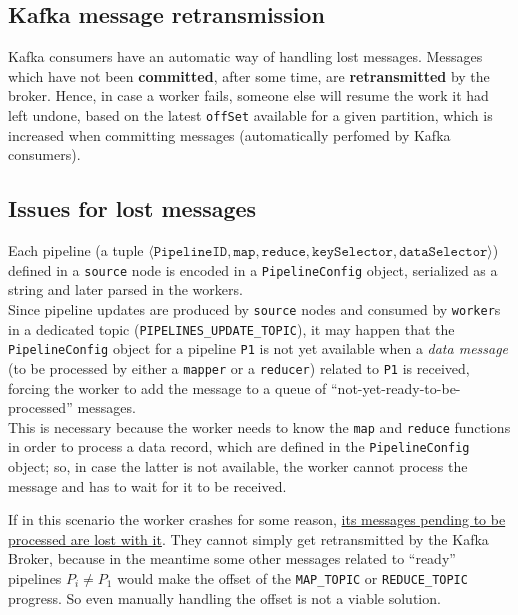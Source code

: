 \subsection{Kafka message retransmission}
Kafka consumers have an automatic way of handling lost messages. Messages which have not been \textbf{committed}, after some time, are \textbf{retransmitted} by the broker. Hence, in case a worker fails, someone else will resume the work it had left undone, based on the latest \texttt{offSet} available for a given partition, which is increased when committing messages (automatically perfomed by Kafka consumers).

\subsection{Issues for lost messages}
Each pipeline (a tuple $\langle \texttt{PipelineID}, \texttt{map}, \texttt{reduce}, \texttt{keySelector}, \texttt{dataSelector} \rangle$) defined in a \texttt{source} node is encoded in a \lstinline|PipelineConfig| object, serialized as a string and later parsed in the workers.\\ 
Since pipeline updates are produced by \texttt{source} nodes and consumed by \texttt{worker}s in a dedicated topic (\lstinline|PIPELINES_UPDATE_TOPIC|), it may happen that the \lstinline|PipelineConfig| object for a pipeline \lstinline|P1| is not yet available when a \textit{data message} (to be processed by either a \texttt{mapper} or a \texttt{reducer}) related to \lstinline|P1| is received, forcing the worker to add the message to a queue of ``not-yet-ready-to-be-processed'' messages.\\
This is necessary because the worker needs to know the \lstinline|map| and \lstinline|reduce| functions in order to process a data record, which are defined in the \lstinline|PipelineConfig| object;
so, in case the latter is not available, the worker cannot process the message and has to wait for it to be received.

If in this scenario the worker crashes for some reason, \ul{its messages pending to be processed are lost with it}.
They cannot simply get retransmitted by the Kafka Broker, because in the meantime some other messages related to ``ready'' pipelines $P_i \neq P_1$ would make the offset of the \lstinline|MAP_TOPIC| or \lstinline|REDUCE_TOPIC |progress.
So even manually handling the offset is not a viable solution.


